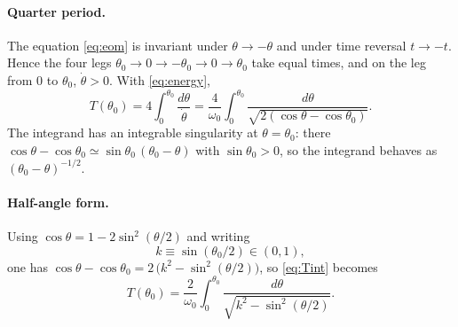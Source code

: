\documentclass{article}
\begin{document}
\paragraph{Quarter period.}
The equation \eqref{eq:eom} is invariant under $\theta \to -\theta$ and under
time reversal $t \to -t$. Hence the four legs $\theta_0 \to 0 \to -\theta_0
\to 0 \to \theta_0$ take equal times, and on the leg from $0$ to $\theta_0$,
$\dot\theta > 0$. With \eqref{eq:energy},
\begin{equation}
  T(\theta_0) = 4\int_0^{\theta_0} \frac{d\theta}{\dot\theta}
  = \frac{4}{\omega_0} \int_0^{\theta_0}
    \frac{d\theta}{\sqrt{2(\cos\theta - \cos\theta_0)}} .
  \label{eq:Tint}
\end{equation}
The integrand has an integrable singularity at $\theta = \theta_0$: there
$\cos\theta - \cos\theta_0 \simeq \sin\theta_0\,(\theta_0 - \theta)$ with
$\sin\theta_0 > 0$, so the integrand behaves as
$(\theta_0-\theta)^{-1/2}$.

\paragraph{Half-angle form.}
Using $\cos\theta = 1 - 2\sin^2(\theta/2)$ and writing
\begin{equation}
  k \equiv \sin(\theta_0/2) \in (0,1),
  \label{eq:k}
\end{equation}
one has $\cos\theta - \cos\theta_0 = 2\,\bigl(k^2 - \sin^2(\theta/2)\bigr)$,
so \eqref{eq:Tint} becomes
\begin{equation}
  T(\theta_0) = \frac{2}{\omega_0}\int_0^{\theta_0}
    \frac{d\theta}{\sqrt{k^2 - \sin^2(\theta/2)}} .
  \label{eq:Thalf}
\end{equation}
\end{document}
